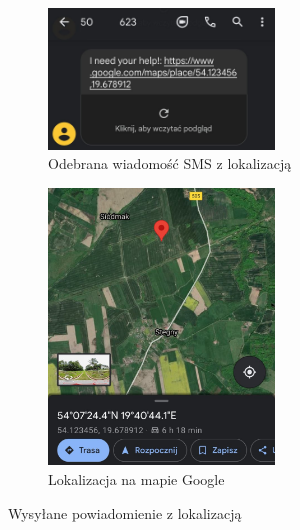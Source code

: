 \begin{figure}[h]
    \centering
    \begin{subfigure}[b]{6cm}
    \includegraphics[width=6cm]{Graphics/sms.jpg}
    \caption{Odebrana wiadomość SMS z lokalizacją}
    \label{img:sms}
    \end{subfigure}%
    \vspace{1cm}
    \begin{subfigure}[b]{6cm}
    \includegraphics[width=6cm]{Graphics/maps.jpg}
    \caption{Lokalizacja na mapie Google}
    \label{img:maps}
    \end{subfigure}
    \caption{Wysyłane powiadomienie z lokalizacją}
    \label{img:notification}
\end{figure}
